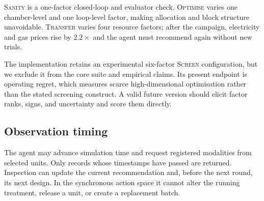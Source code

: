 \textsc{Sanity} is a one-factor closed-loop and evaluator check. \textsc{Optimise} varies
one chamber-level and one loop-level factor, making allocation and block structure
unavoidable. \textsc{Transfer} varies four resource factors; after the campaign, electricity
and gas prices rise by $2.2\times$ and the agent must recommend again without new trials.

The implementation retains an experimental six-factor \textsc{Screen} configuration, but
we exclude it from the core suite and empirical claims. Its present endpoint is operating
regret, which measures scarce high-dimensional optimisation rather than the stated
screening construct. A valid future version should elicit factor ranks, signs, and
uncertainty and score them directly.

\subsection{Observation timing}
The agent may advance simulation time and request registered modalities from selected units.
Only records whose timestamps have passed are returned. Inspection can update the current
recommendation and, before the next round, its next design. In the synchronous action space
it cannot alter the running treatment, release a unit, or create a replacement batch.
